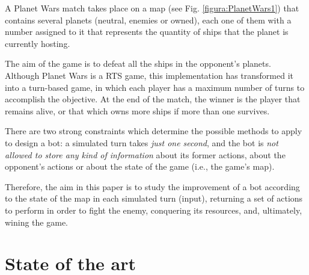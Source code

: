 \documentclass[preprint]{elsarticle}
\begin{document}
A Planet Wars match takes place on a map (see Fig. \ref{figura:PlanetWars1}) %
that contains several planets (neutral, enemies or owned), each one of them with a number assigned to it that represents the quantity of ships that the planet is currently hosting. 

The aim of the game is to defeat all the ships in the opponent's planets. Although Planet Wars is a RTS game, this implementation has transformed it into a turn-based game, in which each player has a maximum number of turns to accomplish the objective. At the end of the match, the winner is the player that remains alive, or that which owns more ships if more than one survives. 

There are two strong constraints which determine the possible methods to apply to design a bot: a simulated turn takes \textit{just one second}, 
and the bot is \textit{not allowed to store any kind of information} about its former actions, about the opponent's actions or about the state of the game (i.e., the game's map). 

Therefore, the aim in this paper is to study the improvement of a bot according to the state of the map in each simulated turn (input), returning a set of actions to perform in order to fight the enemy, conquering its resources, and, ultimately, wining the game. 

\section{State of the art}
\label{sec:soa}
\end{document}
